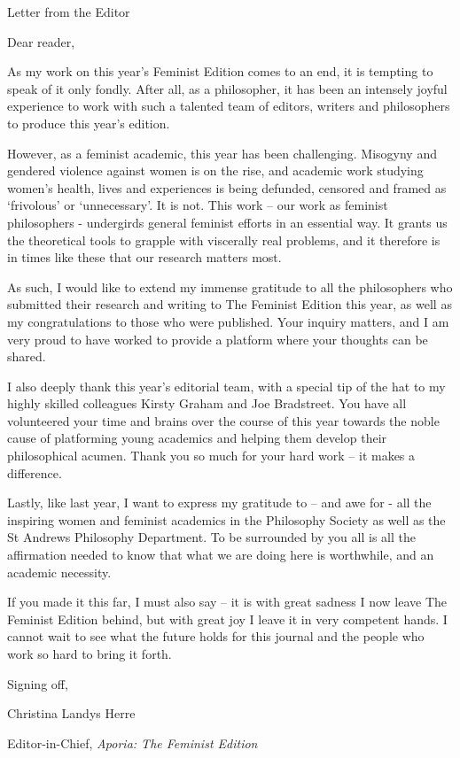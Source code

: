 \vspace*{\credgap}
{\noindent\LARGE\sc Letter from the Editor}
\vspace{\credgap}

\vspace{\ackgap}\noindent
Dear reader,

\vspace{\credgap}\noindent
As my work on this year’s Feminist Edition comes to an end, it is
tempting to speak of it only fondly. After all, as a philosopher, it
has been an intensely joyful experience to work with such a talented
team of editors, writers and philosophers to produce this year’s
edition.

However, as a feminist academic, this year has been challenging.
Misogyny and gendered violence against women is on the rise, and
academic work studying women’s health, lives and experiences is being
defunded, censored and framed as ‘frivolous’ or ‘unnecessary’. It is
not. This work – our work as feminist philosophers - undergirds
general feminist efforts in an essential way. It grants us the
theoretical tools to grapple with viscerally real problems, and it
therefore is in times like these that our research matters most.

As such, I would like to extend my immense gratitude to all the
philosophers who submitted their research and writing to The Feminist
Edition this year, as well as my congratulations to those who were
published. Your inquiry matters, and I am very proud to have worked to
provide a platform where your thoughts can be shared.

I also deeply thank this year’s editorial team, with a special tip of
the hat to my highly skilled colleagues Kirsty Graham and Joe
Bradstreet. You have all volunteered your time and brains over the
course of this year towards the noble cause of platforming young
academics and helping them develop their philosophical acumen. Thank
you so much for your hard work – it makes a difference.

Lastly, like last year, I want to express my gratitude to – and awe
for - all the inspiring women and feminist academics in the Philosophy
Society as well as the St Andrews Philosophy Department. To be
surrounded by you all is all the affirmation needed to know that what
we are doing here is worthwhile, and an academic necessity.

If you made it this far, I must also say – it is with great sadness I
now leave The Feminist Edition behind, but with great joy I leave it
in very competent hands. I cannot wait to see what the future holds
for this journal and the people who work so hard to bring it forth.

\vspace{\credgap}\noindent
Signing off,

\vspace{\ackgap}\noindent
Christina Landys Herre

\noindent
Editor-in-Chief, \emph{Aporia: The Feminist Edition}
